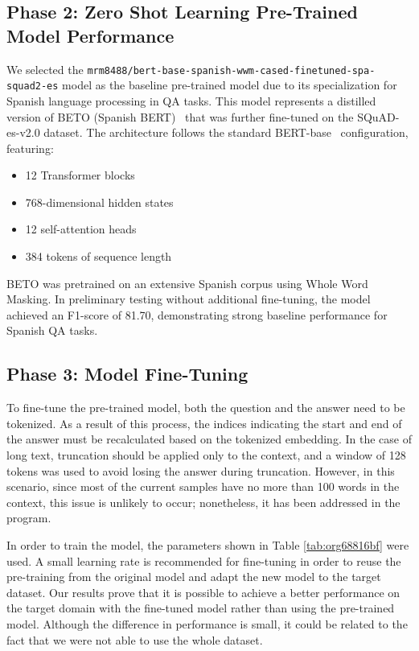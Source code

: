 \documentclass[runningheads]{llncs}
\begin{document}
\subsection{Phase 2: Zero Shot Learning Pre-Trained Model Performance}
\label{sec:phase-2:-baseline}


We selected the
\texttt{mrm8488/bert-base-spanish-wwm-cased-finetuned-spa-squad2-es}
model as the baseline pre-trained model due to its specialization for
Spanish language processing in \ac{QA} tasks. This model represents a
distilled version of BETO (Spanish BERT)~\cite{CaneteCFP2020} that was
further fine-tuned on the SQuAD-es-v2.0 dataset. The architecture
follows the standard BERT-base~\cite{devlin2018bert} configuration,
featuring:
\begin{itemize}
    \item 12 Transformer blocks
    \item 768-dimensional hidden states
    \item 12 self-attention heads
    \item 384 tokens of sequence length
\end{itemize}

BETO was pretrained on an extensive Spanish corpus using Whole Word
Masking. In preliminary testing without additional fine-tuning, the
model achieved an F1-score of 81.70, demonstrating strong baseline
performance for Spanish \ac{QA} tasks.

\subsection{Phase 3: Model Fine-Tuning}
\label{sec:model-fine-tuning}
To fine-tune the pre-trained model, both the question and the answer
need to be tokenized. As a result of this process, the indices
indicating the start and end of the answer must be recalculated based
on the tokenized embedding. In the case of long text, truncation
should be applied only to the context, and a window of 128 tokens was
used to avoid losing the answer during truncation. However, in this
scenario, since most of the current samples have no more than 100
words in the context, this issue is unlikely to occur; nonetheless, it
has been addressed in the program.

In order to train the model, the parameters shown in Table
\ref{tab:org68816bf} were used. A small learning rate is recommended
for fine-tuning in order to reuse the pre-training from the original model and
adapt the new model to the target dataset. Our results prove that it
is possible to achieve a better performance on the target domain with
the fine-tuned model rather than using the pre-trained model. Although
the difference in performance is small, it could be related to the
fact that we were not able to use the whole dataset.
\end{document}
